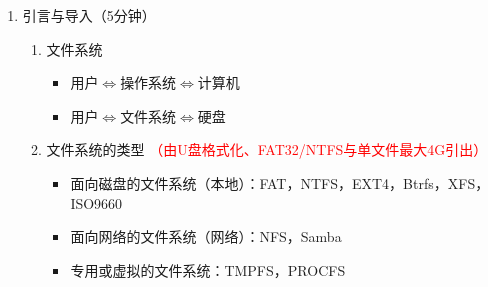 \documentclass{TIJMUjiaoanLL}
\begin{document}
\firstTail


\newpage
\otherHeader

\begin{enumerate}
  \item 引言与导入（5分钟）
    \begin{enumerate}
      \item 文件系统
	\begin{itemize}
	  \item 用户$\Leftrightarrow$操作系统$\Leftrightarrow$计算机
	  \item 用户$\Leftrightarrow$文件系统$\Leftrightarrow$硬盘
	\end{itemize}
      \item 文件系统的类型 \textcolor{red}{（由U盘格式化、FAT32/NTFS与单文件最大4G引出）}
	\begin{itemize}
	  \item 面向磁盘的文件系统（本地）：FAT，NTFS，EXT4，Btrfs，XFS，ISO9660
	  \item 面向网络的文件系统（网络）：NFS，Samba
	  \item 专用或虚拟的文件系统：TMPFS，PROCFS
	\end{itemize}
    \end{enumerate}



\end{enumerate}
\end{document}
